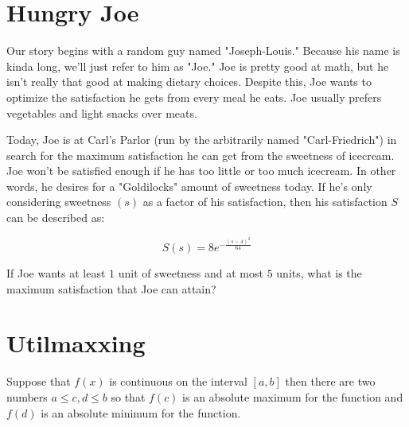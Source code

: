 \setcounter{chapter}{0}
\chapter{Hungry Joe}
Our story begins with a random guy named "Joseph-Louis."
Because his name is kinda long, we'll just refer to him as "Joe."
Joe is pretty good at math, but he isn't really that good at making dietary choices.
Despite this, Joe wants to optimize the satisfaction he gets from every meal he eats.
Joe usually prefers vegetables and light snacks over meats.

Today, Joe is at Carl's Parlor (run by the arbitrarily named "Carl-Friedrich") in search for the maximum satisfaction he can get from the sweetness of icecream.
Joe won't be satisfied enough if he has too little or too much icecream.
In other words, he desires for a "Goldilocks" amount of sweetness today.
If he's only considering sweetness $(s)$ as a factor of his satisfaction, then his satisfaction $S$ can be described as:\par
\LARGE
\begin{equation}
	S(s) = 8e^{-\frac{(s-4)^2}{64}}
\end{equation}
\normalsize
\begin{eg}
	If Joe wants at least $1$ unit of sweetness and at most $5$ units, what is the maximum satisfaction that Joe can attain?
\end{eg}
\setcounter{chapter}{1}
\chapter{Utilmaxxing}

\begin{theorem}
	Suppose that \(f\left( x \right)\) is continuous on the interval \(\left[ {a,b} \right]\) then there are two numbers \(a \le c,d \le b\) so that \(f\left( c \right)\) is an absolute maximum for the function and \(f\left( d \right)\) is an absolute minimum for the function.
\end{theorem}